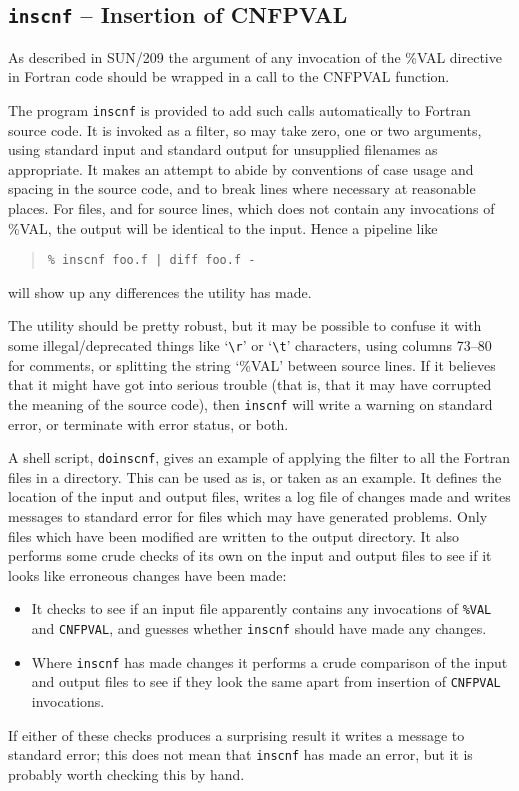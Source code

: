 \documentclass[twoside,11pt]{article}
\newcommand{\xref}[3]{#1}
\renewcommand{\_}{\texttt{\symbol{95}}}
\begin{document}
\subsection{{\tt inscnf} -- Insertion of CNF\_PVAL}

As described in \xref{SUN/209}{sun209}{pointers} the argument of
any invocation of the \%VAL directive in Fortran code 
should be wrapped in a call to 
the \xref{CNF\_PVAL}{sun209}{CNF\_PVAL} function.

The program {\tt inscnf} is provided to add such calls automatically
to Fortran source code.  It is invoked as a filter, so may take zero,
one or two arguments, using standard input and standard output for 
unsupplied filenames as appropriate.  It makes an attempt to abide by
conventions of case usage and spacing in the source code, and to
break lines where necessary at reasonable places.  For files,
and for source lines, which does not contain any invocations of \%VAL, 
the output will be identical to the input.  Hence a pipeline like
\begin{quote}
\begin{verbatim}
% inscnf foo.f | diff foo.f - 
\end{verbatim}
\end{quote}
will show up any differences the utility has made.

The utility should be pretty robust, but it may be possible to
confuse it with some illegal/deprecated things like 
`\verb+\r+' or `\verb+\t+' 
characters, using columns 73--80 for comments, or splitting the string
`\%VAL' between source lines.  If it believes
that it might have got into serious trouble (that is, that it may
have corrupted the meaning of the source code), then {\tt inscnf}
will write a warning on standard error, or terminate with error
status, or both.

A shell script, {\tt do\_inscnf}, gives an example of applying the filter
to all the Fortran files in a directory.  This can be used as is,
or taken as an example.  It defines the location of the input and
output files, writes a log file of changes made and writes messages 
to standard error for files which may have generated problems.
Only files which have been modified are written to the output directory.
It also performs some crude checks of its own on the input and output
files to see if it looks like erroneous changes have been made:
\begin{itemize}
\item 
It checks to see if an input file apparently contains any invocations
of {\tt \%VAL} and {\tt CNF\_PVAL}, and guesses whether {\tt inscnf} 
should have made any changes.
\item
Where {\tt inscnf} has made changes it performs a crude comparison of
the input and output files to see if they look the same apart from
insertion of {\tt CNF\_PVAL} invocations.
\end{itemize}
If either of these checks produces a surprising result it writes a 
message to standard error; this does not mean that {\tt inscnf} has
made an error, but it is probably worth checking this by hand.







\end{document}

